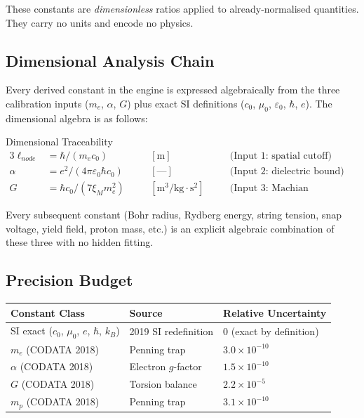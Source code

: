 These constants are \emph{dimensionless} ratios applied to already-normalised quantities.  They carry no units and encode no physics.

\subsection{Dimensional Analysis Chain}
Every derived constant in the engine is expressed algebraically from the three calibration inputs ($m_e$, $\alpha$, $G$) plus exact SI definitions ($c_0$, $\mu_0$, $\varepsilon_0$, $\hbar$, $e$).  The dimensional algebra is as follows:

\begin{resultbox}{Dimensional Traceability}
\begin{alignat*}{3}
\ell_{node} &= \hbar / (m_e c_0) \quad &&[\text{m}] \quad &&\text{(Input 1: spatial cutoff)} \\
\alpha &= e^2 / (4\pi\varepsilon_0 \hbar c_0) \quad &&[\text{---}] \quad &&\text{(Input 2: dielectric bound)} \\
G &= \hbar c_0 / (7 \xi_M m_e^2) \quad &&[\text{m}^3/\text{kg}\cdot\text{s}^2] \quad &&\text{(Input 3: Machian boundary)}
\end{alignat*}
\end{resultbox}

Every subsequent constant (Bohr radius, Rydberg energy, string tension, snap voltage, yield field, proton mass, etc.) is an explicit algebraic combination of these three with no hidden fitting.

\subsection{Precision Budget}

\begin{center}
\small
\renewcommand{\arraystretch}{1.2}
\begin{tabular}{lll}
\toprule
\textbf{Constant Class} & \textbf{Source} & \textbf{Relative Uncertainty} \\
\midrule
SI exact ($c_0$, $\mu_0$, $e$, $\hbar$, $k_B$) & 2019 SI redefinition & 0 (exact by definition) \\
$m_e$ (CODATA 2018) & Penning trap & $3.0 \times 10^{-10}$ \\
$\alpha$ (CODATA 2018) & Electron $g$-factor & $1.5 \times 10^{-10}$ \\
$G$ (CODATA 2018) & Torsion balance & $2.2 \times 10^{-5}$ \\
$m_p$ (CODATA 2018) & Penning trap & $3.1 \times 10^{-10}$ \\
\bottomrule
\end{tabular}
\end{center}

